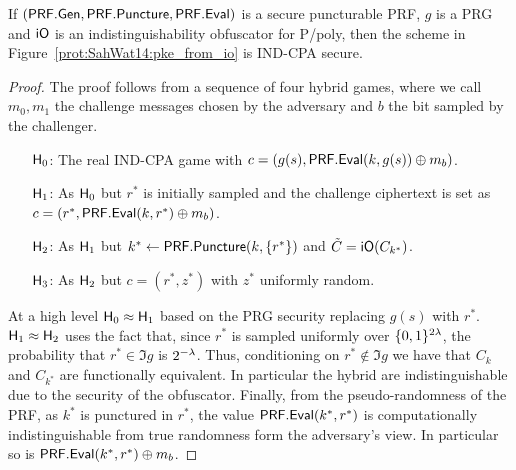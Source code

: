\begin{proposition}
	\label{prop:SahWat98}
	If $(\mathsf{PRF.Gen}, \mathsf{PRF.Puncture}, \mathsf{PRF.Eval})$ is a secure puncturable PRF, $g$ is a PRG and $\mathsf{iO}$ is an indistinguishability obfuscator for P/poly, then the scheme in Figure~\ref{prot:SahWat14:pke_from_io} is IND-CPA secure.
\end{proposition}
\begin{proof}
	The proof follows from a sequence of four hybrid games, where we call $m_0, m_1$ the challenge messages chosen by the adversary and $b$ the bit sampled by the challenger.
	\begin{itemize}
		\item[$\mathsf{H}_0$:] The real IND-CPA game with $c = (g(s), \mathsf{PRF.Eval}(k, g(s)) \oplus m_b)$.
		
		\item[$\mathsf{H}_1$:] As $\mathsf{H}_0$ but $r^\ast$ is initially sampled and the challenge ciphertext is set as $c = (r^\ast, \mathsf{PRF.Eval}(k, r^\ast) \oplus m_b)$.
		
		\item[$\mathsf{H}_2$:] As $\mathsf{H}_1$ but $k^\ast \gets \mathsf{PRF.Puncture}(k, \{r^\ast\})$ and $\tilde{C} = \mathsf{iO}(C_{k^\ast})$.
		
		\item[$\mathsf{H}_3$:] As $\mathsf{H}_2$ but $c = (r^\ast, z^\ast)$ with $z^\ast$ uniformly random.
	\end{itemize}
	At a high level $\mathsf{H}_0 \approx \mathsf{H}_1$ based on the PRG security replacing $g(s)$ with $r^\ast$.
	$\mathsf{H}_1 \approx \mathsf{H}_2$ uses the fact that, since $r^\ast$ is sampled uniformly over $\{0,1\}^{2\lambda}$, the probability that $r^\ast \in \Im g$ is $2^{-\lambda}$.
	Thus, conditioning on $r^\ast \notin \Im g$ we have that $C_k$ and $C_{k^\ast}$ are functionally equivalent.
	In particular the hybrid are indistinguishable due to the security of the obfuscator.
	Finally, from the pseudo-randomness of the PRF, as $k^\ast$ is punctured in $r^\ast$, the value $\mathsf{PRF.Eval}(k^\ast, r^\ast)$ is computationally indistinguishable from true randomness form the adversary's view.
	In particular so is $\mathsf{PRF.Eval}(k^\ast, r^\ast) \oplus m_b$.
\end{proof}



